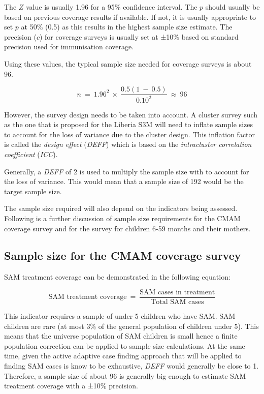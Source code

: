 \documentclass[12pt,a4paper]{book}
\theoremstyle{definition}
\theoremstyle{definition}
\theoremstyle{definition}
\theoremstyle{remark}
\begin{document}
The \(Z\) value is usually 1.96 for a 95\% confidence interval. The
\(p\) should usually be based on previous coverage results if available.
If not, it is usually appropriate to set \(p\) at 50\% (0.5) as this
results in the highest sample size estimate. The precision (\(c\)) for
coverage surveys is usually set at ±10\% based on standard precision
used for immunisation coverage.

Using these values, the typical sample size needed for coverage surveys
is about 96.

\[ n ~ = ~ 1.96^2 ~ \times ~ \frac{0.5(1 ~ - ~ 0.5)}{0.10 ^ 2} ~ \approx ~  96 \]

However, the survey design needs to be taken into account. A cluster
survey such as the one that is proposed for the Liberia S3M will need to
inflate sample sizes to account for the loss of variance due to the
cluster design. This inflation factor is called the \emph{design effect}
(\emph{DEFF}) which is based on the \emph{intracluster correlation
coefficient} (\emph{ICC}).

Generally, a \emph{DEFF} of 2 is used to multiply the sample size with
to account for the loss of variance. This would mean that a sample size
of 192 would be the target sample size.

The sample size required will also depend on the indicators being
assessed. Following is a further discussion of sample size requirements
for the CMAM coverage survey and for the survey for children 6-59 months
and their mothers.

\hypertarget{sample-size-for-the-cmam-coverage-survey}{%
\subsection{Sample size for the CMAM coverage
survey}\label{sample-size-for-the-cmam-coverage-survey}}

SAM treatment coverage can be demonstrated in the following equation:

\[ \text{SAM treatment coverage} ~ = ~ \frac{\text{SAM cases in treatment}}{\text{Total SAM cases}} \]

This indicator requires a sample of under 5 children who have SAM. SAM
children are rare (at most 3\% of the general population of children
under 5). This means that the universe population of SAM children is
small hence a finite population correction can be applied to sample size
calculations. At the same time, given the active adaptive case finding
approach that will be applied to finding SAM cases is know to be
exhaustive, \emph{DEFF} would generally be close to 1. Therefore, a
sample size of about 96 is generally big enough to estimate SAM
treatment coverage with a ±10\% precision.
\end{document}

